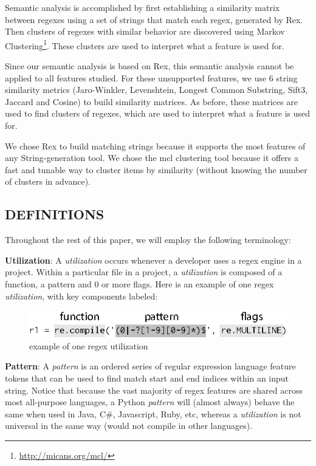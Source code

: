 Semantic analysis is accomplished by first establishing a similarity matrix between regexes using a set of strings that match each regex, generated by Rex.  Then clusters of regexes with similar behavior are discovered using Markov Clustering\footnote{\url{http://micans.org/mcl/}}.  These clusters are used to interpret what a feature is used for.

Since our semantic analysis is based on Rex, this semantic analysis cannot be applied to all features studied.  For these unsupported features, we use 6 string similarity metrics (Jaro-Winkler, Levenshtein, Longest Common Substring, Sift3, Jaccard and Cosine) to build similarity matrices.  As before, these matrices are used to find clusters of regexes, which are used to interpret what a feature is used for.

We chose Rex to build matching strings because it supports the most features of any String-generation tool.  We chose the mcl clustering tool because it offers a fast and tunable way to cluster items by similarity (without knowing the number of clusters in advance).

\subsection{{DEFINITIONS}}
Throughout the rest of this paper, we will employ the following terminology:

\noindent \textbf{Utilization}: A \emph{utilization} occurs whenever a developer uses a regex engine in a project.  Within a particular file in a project, a \emph{utilization} is composed of a function, a pattern and 0 or more flags.  Here is an example of one regex \emph{utilization}, with key components labeled:

\begin{figure}[htb]
\centering
\includegraphics[width=\columnwidth]{../illustrations/exampleUsage.eps}
\caption{example of one regex utilization}
\label{fig:exampleUsage}
\end{figure}

\noindent \textbf{Pattern}: A \emph{pattern} is an ordered series of regular expression language feature tokens that can be used to find match start and end indices within an input string.  Notice that because the vast majority of regex features are shared across most all-purpose languages, a Python \emph{pattern} will (almost always) behave the same when used in Java, C\#, Javascript, Ruby, etc, whereas a \emph{utilization} is not universal in the same way (would not compile in other languages).

